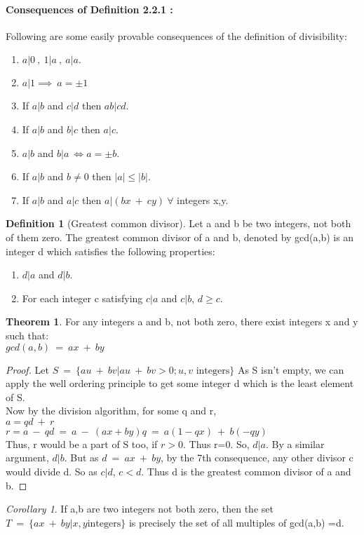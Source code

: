 \documentclass[15,a4paper]{report}
\theoremstyle{definition}
\newtheorem{definition}{Definition}[section]
\newtheorem{theorem}{Theorem}[section]
\theoremstyle{remark}
\newtheorem{corollary}{Corollary}[theorem]
\begin{document}
\paragraph{Consequences of Definition 2.2.1 :}
Following are some easily provable consequences of the definition of divisibility:
\begin{enumerate}
    \item $a|0~,~1|a~,~ a|a.$
    \item $a|1 \implies ~a = \pm 1$
    \item If $a|b$ and $c|d$ then $ab|cd$.
    \item If $a|b$ and $b|c$ then $a|c$.
    \item $a|b$ and $b|a ~ \iff a = \pm b$.
    \item If $a|b$ and $b\neq 0$ then $|a| \leq |b|$.
    \item If $a|b$ and $a|c$ then $a|(bx~ + ~cy)~ \forall$ integers x,y. 
\end{enumerate}

\begin{definition}[Greatest common divisor]
    Let a and b be two integers, not both of them zero. The greatest common divisor of a and b, denoted by gcd(a,b) is an integer d which satisfies the following properties:
    \begin{enumerate}
        \item $d|a$ and $d|b$.
        \item For each integer c satisfying $c|a$ and $c|b$, $d \geq c$.
    \end{enumerate}
\end{definition}

\begin{theorem}
    For any integers a and b, not both zero, there exist integers x and y such that:\\
    $gcd(a,b) ~=~ ax ~+~ by$
\end{theorem}
\begin{proof}
    Let $S ~=~ \{ au ~+~ bv | au ~+~ bv>0; u,v \textrm{ integers} \}$
    As S isn't empty, we can apply the well ordering principle to get some integer d which is the least element of S.\\
    Now by the division algorithm, for some q and r, \\
    $ a = qd ~+~ r$\\
    $ r = a ~-~ qd ~=~ a ~-~ (ax+by)q ~=~ a(1-qx) ~+~ b(-qy) $\\
    Thus, r would be a part of S too, if $r>0$. Thus r=0.
    So, $d|a$. By a similar argument, $d|b$. But as $d ~=~ ax ~+~ by$, by the 7th consequence, any other divisor c would divide d. So as $c|d$, $ c<d$. Thus d is the greatest common divisor of a and b.
\end{proof}
\begin{corollary}
    If a,b are two integers not both zero, then the set \\
    $T ~=~ \{ ax ~+~ by | x,y \textrm{integers} \}$
    is precisely the set of all multiples of gcd(a,b) =d.
\end{corollary}
\end{document}
